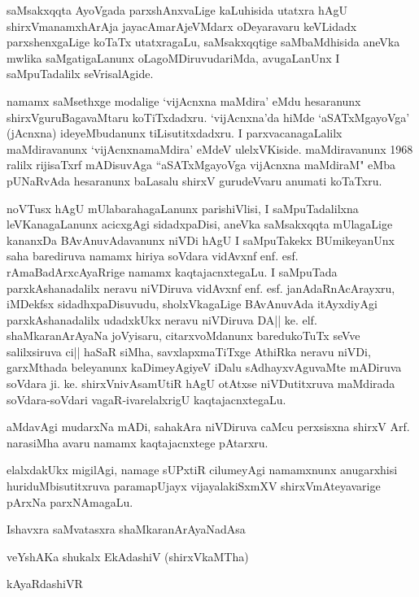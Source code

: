 saMsakxqqta AyoVgada parxshAnxvaLige kaLuhisida utatxra hAgU shirxVmanamxhArAja jayacAmarAjeVMdarx oDeyaravaru keVLidadx parxshenxgaLige koTaTx utatxragaLu, saMsakxqqtige saMbaMdhisida aneVka mwlika saMgatigaLanunx oLagoMDiruvudariMda, avugaLanUnx I saMpuTadalilx seVrisalAgide.

namamx saMsethxge modalige `vijAcnxna maMdira' eMdu hesaranunx shirxVguruBaga\break\-vaMtaru koTiTxdadxru. `vijAcnxna'da hiMde `aSATxMgayoVga' (jAcnxna) ideyeMbu\-danunx tiLisutitxdadxru. I parxvacanagaLalilx maMdira\-vanunx `vijAcnxnamaMdira' eMdeV ulelxVKiside. maMdiravanunx 1968 ralilx rijisaTxrf mADisuvAga ``aSATxMgayoVga vijAcnxna maMdiraM" eMba pUNaRvAda hesaranunx baLasalu shirxV gurudeVvaru anumati koTaTxru.

noVTusx hAgU mUlabarahagaLanunx parishiVlisi, I saMpuTadalilxna leVKana\-gaLanunx acicxgAgi sidadx\-paDisi, aneVka saMsakxqqta mUlagaLige kananxDa BAvAnuvAda\-vanunx niVDi hAgU I saMpuTakekx BUmike\-yanUnx saha barediruva namamx hiriya soVdara vidAvxnf enf. esf. rAmaBadArxcAyaRrige namamx kaqtajacnxtegaLu. I saMpuTada parxkAshanadalilx neravu niVDiruva vidAvxnf enf. esf. janAdaRnAcArayxru, iMDekfsx sidadhx\-paDisuvudu, sholxVkagaLige BAvAnuvAda itAyxdiyAgi parxkAshanadalilx udadxkUkx neravu niVDi\-ruva DA|| ke. elf. shaMkaranArAyaNa joVyisaru, citarxvoMdanunx baredukoTuTx seVve salilxsiruva ci|| haSaR siMha, savxlapxmaTiTxge AthiRka neravu niVDi, garxMthada beleyanunx kaDimeyAgiyeV iDalu sAdhayx\-vAguvaMte mADiruva soVdara ji. ke. shirxVnivAsamUtiR hAgU otAtxse niVDutitxruva maMdirada soVdara-\-soVdari vagaR-ivarelalxrigU kaqtajacnxtegaLu.

aMdavAgi mudarxNa mADi, sahakAra niVDiruva caMcu perxsisxna shirxV Arf. narasiMha avaru namamx kaqtajacnxtege pAtarxru.

elalxdakUkx migilAgi, namage sUPxtiR cilumeyAgi namamxnunx anugarxhisi huri\-duMbisutitxruva paramapUjayx vijayalakiSxmXV shirxVmAteyavarige pArxNa parxNAmagaLu.

\vskip 1cm

\noindent Ishavxra saMvatasxra \hfill shaMkaranArAyaNadAsa

\noindent veYshAKa shukalx EkAdashiV \hfill (shirxVkaMTha)

 \hfill kAyaRdashiVR

